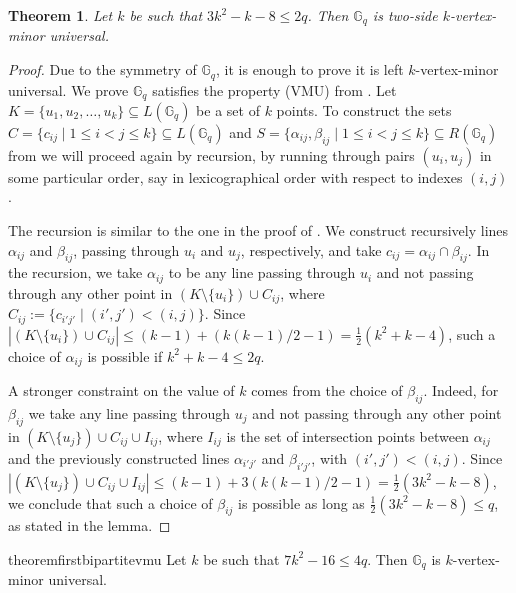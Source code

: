 \documentclass[10pt,a4paper]{article}
\newtheorem{theorem}{Theorem}[section]
\newcommand{\ls}{\leqslant}
\newcommand{\G}[1][q]{\mathbb{G}_{#1}}
\begin{document}
\begin{theorem}\label{theo:bipartite-kvmu}
    Let $k$ be such that $3k^2-k-8 \ls 2q$. Then $\G$ is two-side  $k$-vertex-minor universal.
\end{theorem}

\begin{proof}
    Due to the symmetry of $\G$, it is enough to prove it is left $k$-vertex-minor universal. We prove $\G$ satisfies the property (VMU) from . Let  $K = \{u_1, u_2, \dots, u_k\} \subseteq L(\G)$ be a set of $k$  points. To construct the sets
    $C = \{c_{ij} \mid 1 \ls i < j \ls k \} \subseteq L(\G)$ and
    $S = \{\alpha_{ij},\beta_{ij} \mid 1 \ls i < j \ls k \} \subseteq R(\G)$ from  we will proceed again by recursion, by running through pairs $(u_i, u_j)$ in some particular order, say in lexicographical order with respect to indexes $(i,j)$.

    \medskip \noindent The recursion is similar to the one in the proof of .  We construct recursively lines $\alpha_{ij}$ and $\beta_{ij}$, passing through $u_i$ and $u_j$, respectively, and take $c_{ij} = \alpha_{ij} \cap \beta_{ij}$. In the recursion, we  take $\alpha_{ij}$ to be any line passing through $u_{i}$ and not passing through any other point in $\left(K\setminus\{u_{i}\}\right) \cup C_{ij}$, where $C_{ij} := \{ c_{i'j'} \mid (i',j') < (i,j)\}$. Since $|\left(K\setminus\{u_{i}\}\right)\cup C_{ij}| \ls (k-1) + (k(k-1)/2-1) = \frac{1}{2}(k^2+k-4)$, such a choice of $\alpha_{ij}$ is possible if  $k^2+k-4 \ls 2q$.

    \medskip \noindent A stronger constraint on the value of $k$ comes from the choice of $\beta_{ij}$. Indeed, for $\beta_{ij}$ we take any line passing through $u_{j}$ and not passing through any other point in $(K\setminus\{u_{j}\}) \cup C_{ij} \cup I_{ij}$, where $I_{ij}$ is the set of intersection points between $\alpha_{ij}$ and the previously constructed lines $\alpha_{i'j'}$ and $\beta_{i'j'}$, with $(i',j') < (i,j)$. Since $|(K\setminus\{u_{j}\}) \cup C_{ij} \cup I_{ij}| \ls (k-1) + 3(k(k-1)/2-1) = \frac{1}{2}(3k^2-k-8)$, we conclude that such a choice of $\beta_{ij}$ is possible as long as $\frac{1}{2}(3k^2-k-8) \ls q$, as stated in the lemma.
\end{proof}

\begin{restatable}{theorem}{firstbipartitevmu}
    \label{theo:bipartite-vmu}
    Let $k$ be such that $7k^2 - 16 \ls 4q$. Then $\G$ is $k$-vertex-minor universal.
\end{restatable}
\end{document}
